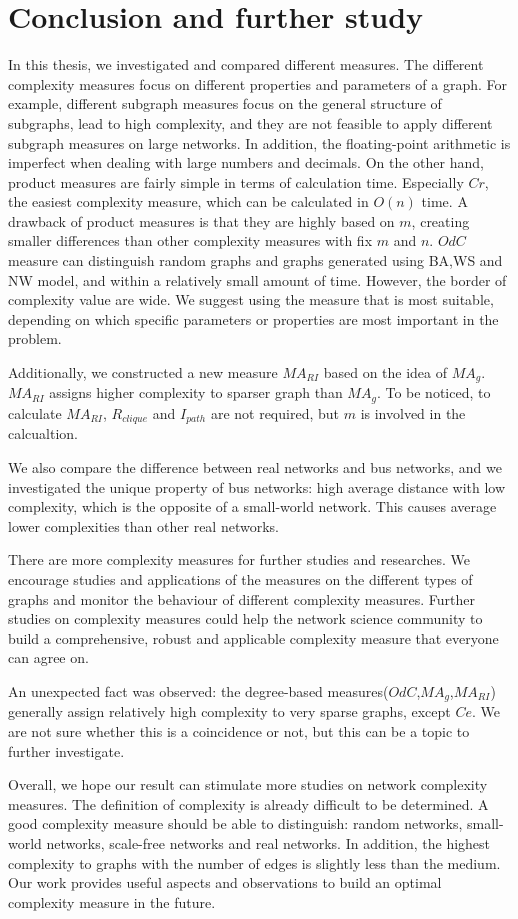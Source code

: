 \documentclass[12pt]{article}
\begin{document}
\section{Conclusion and further study}
In this thesis, we investigated and compared different measures. The different complexity measures focus on different properties and parameters of a graph. For example, different subgraph measures focus on the general structure of subgraphs, lead to high complexity, and they are not feasible to apply different subgraph measures on large networks. In addition, the floating-point arithmetic is imperfect when dealing with large numbers and decimals.
On the other hand, product measures are fairly simple in terms of calculation time. Especially $Cr$, the easiest complexity measure, which can be calculated in $O(n)$ time\cite{KIM20082637}. A drawback of product measures is that they are highly based on $m$, creating smaller differences than other complexity measures with fix $m$ and $n$.
$OdC$ measure can distinguish random graphs and graphs generated using BA,WS and NW model, and within a relatively small amount of time. However, the border of complexity value are wide. We suggest using the measure that is most suitable, depending on which specific parameters or properties are most important in the problem.\par
Additionally, we constructed a new measure $MA_{RI}$ based on the idea of $MA_g$. $MA_{RI}$ assigns higher complexity to sparser graph than $MA_g$. To be noticed, to calculate $MA_{RI}$, $R_{clique}$ and $I_{path}$ are not required, but $m$ is involved in the calcualtion.\par
We also compare the difference between real networks and bus networks, and we investigated the unique property of bus networks: high average distance with low complexity, which is the opposite of a small-world network. This causes average lower complexities than other real networks.\par
There are more complexity measures \cite{emmert-streib_dehmer_2012}\cite{dehmer_barbarini_varmuza_graber_2009} for further studies and researches. We encourage studies and applications of the measures on the different types of graphs and monitor the behaviour of different complexity measures. Further studies on complexity measures could help the network science community to build a comprehensive, robust and applicable complexity measure that everyone can agree on.\par
An unexpected fact was observed: the degree-based measures($OdC$,$MA_g$,$MA_{RI}$) generally assign relatively high complexity to very sparse graphs, except $Ce$. We are not sure whether this is a coincidence or not, but this can be a topic to further investigate.\par
Overall, we hope our result can stimulate more studies on network complexity measures. The definition of complexity is already difficult to be determined. A good complexity measure should be able to distinguish: random networks, small-world networks, scale-free networks and real networks. In addition, the highest complexity to graphs with the number of edges is slightly less than the medium. Our work provides useful aspects and observations to build an optimal complexity measure in the future.
\end{document}
